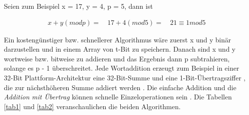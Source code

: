 Seien zum Beispiel x = 17, y = 4, p = 5, dann ist
\begin{ceqn}

\begin{align*}
   x + y ( mod p ) = \quad 17 + 4 (mod 5) = \quad 21 \equiv 1 mod 5
\end{align*}
\end{ceqn}
Ein kostengünstiger bzw. schnellerer Algorithmus wäre zuerst x und y binär darzustellen und in einem Array von t-Bit zu speichern.
Danach sind x und y wortweise bzw.
bitweise zu addieren und das Ergebnis dann p subtrahieren, solange es p - 1 überschreitet. 
Jede Wortaddition erzeugt zum Beispiel in einer 32-Bit Plattform-Architektur eine 32-Bit-Summe und eine 1-Bit-Übertragsziffer , die zur
nächsthöheren Summe addiert werden \cite{nist}. Die einfache Addition und die \textit{Addition mit Übertrag} können schnelle Einzeloperationen sein \cite{Hossain2019}. Die Tabellen \ref{tab1} und \ref{tab2} veranschaulichen die beiden Algorithmen. 

